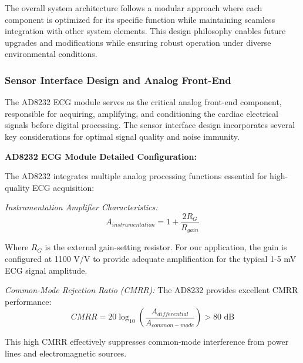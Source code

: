 \documentclass[12pt,a4paper]{article}
\begin{document}
\vspace{0.5cm}

The overall system architecture follows a modular approach where each component is optimized for its specific function while maintaining seamless integration with other system elements. This design philosophy enables future upgrades and modifications while ensuring robust operation under diverse environmental conditions.

\subsubsection{Sensor Interface Design and Analog Front-End}

The AD8232 ECG module serves as the critical analog front-end component, responsible for acquiring, amplifying, and conditioning the cardiac electrical signals before digital processing. The sensor interface design incorporates several key considerations for optimal signal quality and noise immunity.

\vspace{0.5cm}

\textbf{AD8232 ECG Module Detailed Configuration:}

The AD8232 integrates multiple analog processing functions essential for high-quality ECG acquisition:

\vspace{0.3cm}

\textit{Instrumentation Amplifier Characteristics:}
\begin{equation*}
A_{instrumentation} = 1 + \frac{2R_G}{R_{gain}}
\end{equation*}

Where $R_G$ is the external gain-setting resistor. For our application, the gain is configured at 1100 V/V to provide adequate amplification for the typical 1-5 mV ECG signal amplitude.

\vspace{0.3cm}

\textit{Common-Mode Rejection Ratio (CMRR):}
The AD8232 provides excellent CMRR performance:
\begin{equation*}
CMRR = 20 \log_{10}\left(\frac{A_{differential}}{A_{common-mode}}\right) > 80 \text{ dB}
\end{equation*}

This high CMRR effectively suppresses common-mode interference from power lines and electromagnetic sources.

\vspace{0.3cm}
\end{document}
